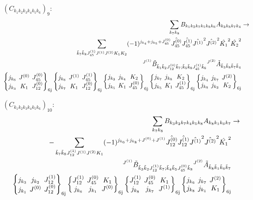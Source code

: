 \documentclass[11pt]{article}
\newcommand{\sixj}[6]{\begingroup\setlength{\arraycolsep}{0.2em}\begin{Bmatrix} #1 & #2 & #3 \\ #4 & #5 & #6 \end{Bmatrix}_{\text{6j}}\endgroup}
\begin{document}
$\left({C}_{{k}_{1}{k}_{2}{k}_{3}{k}_{4}{k}_{5}{k}_{6}}\right)_{9}$:
\begin{align}
\sum_{{k}_{7}{k}_{8}}{B}_{{k}_{1}{k}_{2}{k}_{7}{k}_{5}{k}_{8}{k}_{6}}{A}_{{k}_{3}{k}_{8}{k}_{7}{k}_{4}}&\rightarrow \notag \\\sum_{\tilde{k}_{7}\tilde{k}_{8}J^{(1)}_{45}J^{(1)}J^{(2)}K_{1}K_{2}}(-1)^{j_{{k}_{4}} +j_{{k}_{5}} +J^{(0)}_{45} }\hat{J^{(0)}_{45}}\hat{J^{(1)}_{45}}\hat{J^{(1)}}^{2}\hat{J^{(2)}}^{2}\hat{K_{1}}^{2}\hat{K_{2}}^{2}& \notag \\{}^{J^{(1)}}\tilde{B}_{\tilde{k}_{1}\tilde{k}_{2}J^{(0)}_{12}\tilde{k}_{7};\tilde{k}_{5}\tilde{k}_{8}J^{(1)}_{45}\tilde{k}_{6}}{}^{J^{(2)}}\tilde{A}_{\tilde{k}_{3}\tilde{k}_{8}\tilde{k}_{7}\tilde{k}_{4}}& \notag \\\sixj{j_{{k}_{6}}}{J^{(0)}}{J^{(0)}_{45}}{j_{{k}_{3}}}{K_{1}}{J^{(0)}_{12}}\sixj{j_{{k}_{6}}}{J^{(1)}}{J^{(1)}_{45}}{j_{{k}_{7}}}{K_{1}}{J^{(0)}_{12}}\sixj{j_{{k}_{3}}}{j_{{k}_{4}}}{K_{2}}{j_{{k}_{5}}}{K_{1}}{J^{(0)}_{45}}\sixj{j_{{k}_{7}}}{j_{{k}_{8}}}{K_{2}}{j_{{k}_{5}}}{K_{1}}{J^{(1)}_{45}}\sixj{j_{{k}_{4}}}{j_{{k}_{7}}}{J^{(2)}}{j_{{k}_{8}}}{j_{{k}_{3}}}{K_{2}}
\end{align}

$\left({C}_{{k}_{1}{k}_{2}{k}_{3}{k}_{4}{k}_{5}{k}_{6}}\right)_{10}$:
\begin{align}
\sum_{{k}_{7}{k}_{8}}{B}_{{k}_{3}{k}_{2}{k}_{7}{k}_{4}{k}_{5}{k}_{8}}{A}_{{k}_{8}{k}_{1}{k}_{6}{k}_{7}}&\rightarrow \notag \\-\sum_{\tilde{k}_{7}\tilde{k}_{8}J^{(1)}_{12}J^{(1)}J^{(2)}K_{1}}(-1)^{j_{{k}_{6}} +j_{{k}_{8}} +J^{(0)} +J^{(1)} }\hat{J^{(0)}_{12}}\hat{J^{(1)}_{12}}\hat{J^{(1)}}^{2}\hat{J^{(2)}}^{2}\hat{K_{1}}^{2}& \notag \\{}^{J^{(1)}}\tilde{B}_{\tilde{k}_{3}\tilde{k}_{2}J^{(1)}_{12}\tilde{k}_{7};\tilde{k}_{4}\tilde{k}_{5}J^{(0)}_{45}\tilde{k}_{8}}{}^{J^{(2)}}\tilde{A}_{\tilde{k}_{8}\tilde{k}_{1}\tilde{k}_{6}\tilde{k}_{7}}& \notag \\\sixj{j_{{k}_{3}}}{j_{{k}_{2}}}{J^{(1)}_{12}}{j_{{k}_{1}}}{J^{(0)}}{J^{(0)}_{12}}\sixj{J^{(1)}_{12}}{J^{(0)}_{45}}{K_{1}}{j_{{k}_{6}}}{j_{{k}_{1}}}{J^{(0)}}\sixj{J^{(1)}_{12}}{J^{(0)}_{45}}{K_{1}}{j_{{k}_{8}}}{j_{{k}_{7}}}{J^{(1)}}\sixj{j_{{k}_{6}}}{j_{{k}_{7}}}{J^{(2)}}{j_{{k}_{8}}}{j_{{k}_{1}}}{K_{1}}
\end{align}
\end{document}
